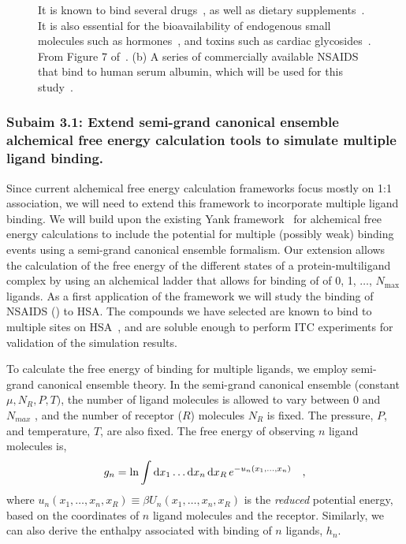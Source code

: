 \documentclass[10pt,final]{article}
\begin{document}
\begin{figure}[H]
{It is known to bind several drugs~\autocite{SJOeHOLM1979a,Bannwarth1996a,Sulkowska2002a,Ghuman2005a,Perez2007a,Zsila2011a}, as well as dietary supplements~\autocite{Pal2013a}. It is also essential for the bioavailability of endogenous small molecules such as hormones~\autocite{Pardridge1986a}, and toxins such as cardiac glycosides~\autocite{Smith1985a}. From Figure 7 of~\autocite{Ghuman2005a}. (b) A series of commercially available NSAIDS that bind to human serum albumin, which will be used for this study~\autocite{Zsila2011a}.}
\label{figure:hsa}
\end{figure} 

\subsubsection*{Subaim 3.1: Extend semi-grand canonical ensemble alchemical free energy calculation tools to simulate multiple ligand binding.}
Since current alchemical free energy calculation frameworks focus mostly on 1:1 association, we will need to extend this framework to incorporate multiple ligand binding. 
%
We will build upon the existing Yank framework~\autocite{Chodera2015a} for alchemical free energy calculations to include the potential for multiple (possibly weak) binding events using a semi-grand canonical ensemble formalism. 
%
Our extension allows the calculation of the free energy of the different states of a protein-multiligand complex by using an alchemical ladder that allows for binding of of 0, 1, $\dots$, $N_\mathrm{max}$ ligands.
%
As a first application of the framework we will study the binding of NSAIDS () to HSA.
%
The compounds we have selected are known to bind to multiple sites on HSA~\autocite{Zsila2011a}, and are soluble enough to perform ITC experiments for validation of the simulation results.
%

To calculate the free energy of binding for multiple ligands, we employ semi-grand canonical ensemble theory.
%
In the semi-grand canonical ensemble (constant $\mu, N_R, P,T)$, the number of ligand molecules is allowed to vary between 0 and $N_{max}$ , and the number of receptor ($R$) molecules $N_R$ is fixed.
%
The pressure, $P$, and temperature, $T$, are also fixed. The free energy of observing $n$ ligand molecules is,
\begin{align}
 g_n = \ln \int \dif x_1 \dots \dif x_n \dif x_R \, e^{-u_n(x_1,\dots,x_n)} \quad,
\end{align}
%
where  $u_n(x_1,\ldots,x_n,x_R) \equiv \beta U_n(x_1,\ldots,x_n,x_R)$ is the \textit{reduced} potential energy, based on the coordinates of $n$ ligand molecules and the receptor. Similarly, we can also derive the enthalpy associated with binding of $n$ ligands, $h_n$.
\end{document}
